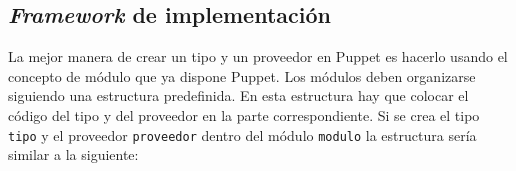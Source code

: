 \subsection{\emph{Framework} de implementación}
\label{sec:modelado-framework}





La mejor manera de crear un tipo y un proveedor en Puppet es hacerlo usando el concepto de módulo que ya dispone Puppet. Los módulos deben organizarse siguiendo una estructura predefinida. En esta estructura hay que colocar el código del tipo y del proveedor en la parte correspondiente. Si se crea el tipo \texttt{tipo} y el proveedor \texttt{proveedor} dentro del módulo \texttt{modulo} la estructura sería similar a la siguiente:

